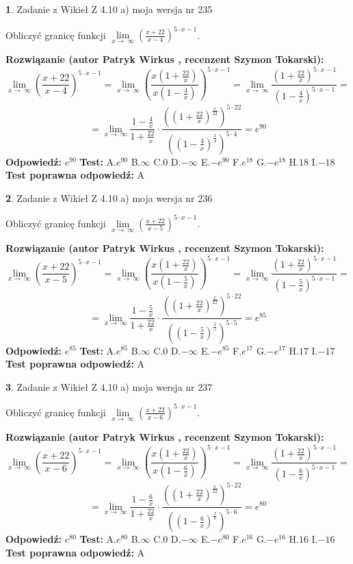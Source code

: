 \documentclass[12pt, a4paper]{article}
\theoremstyle{definition} %
\newtheorem{zad}{}
\newcommand{\zadStart}[1]{\begin{zad}#1\newline}
\newcommand{\zadStop}{\end{zad}}
\newcommand{\rozwStart}[2]{\noindent \textbf{Rozwiązanie (autor #1 , recenzent #2): }\newline}
\newcommand{\rozwStop}{\newline}
\newcommand{\odpStart}{\noindent \textbf{Odpowiedź:}\newline}
\newcommand{\odpStop}{\newline}
\newcommand{\testStart}{\noindent \textbf{Test:}\newline}
\newcommand{\testStop}{\newline}
\newcommand{\kluczStart}{\noindent \textbf{Test poprawna odpowiedź:}\newline}
\newcommand{\kluczStop}{\newline}
\begin{document}
\zadStart{Zadanie z Wikieł Z 4.10 a) moja wersja nr 235}

Obliczyć granicę funkcji  $\lim\limits_{x\to\ \infty}(\frac{x+22}{x-4})^{5\cdot x-1}$.
\zadStop
\rozwStart{Patryk Wirkus}{Szymon Tokarski}
$$\lim\limits_{x\to\ \infty}(\frac{x+22}{x-4})^{5\cdot x-1} = \lim\limits_{x\to\ \infty}(\frac{x(1+\frac{22}{x})}{x(1-\frac{4}{x})})^{5\cdot x-1}=\lim\limits_{x\to\ \infty}\frac{(1+\frac{22}{x})^{5\cdot x-1}}{(1-\frac{4}{x})^{5\cdot x-1}}=$$
$$=\lim\limits_{x\to\ \infty}\frac{1-\frac{4}{x}}{1+\frac{22}{x}}\cdot\frac{((1+\frac{22}{x})^{\frac{x}{22}})^{5\cdot22}}{((1-\frac{4}{x})^{\frac{x}{4}})^{5\cdot4}}=e^{90}$$
\rozwStop
\odpStart
$e^{90}$
\odpStop
\testStart
A.$e^{90}$ B.$\infty$ C.$0$ D.$-\infty$ E.$-e^{90}$
F.$e^{18}$ G.$-e^{18}$
H.$18$
I.$-18$
\testStop
\kluczStart
A
\kluczStop



\zadStart{Zadanie z Wikieł Z 4.10 a) moja wersja nr 236}

Obliczyć granicę funkcji  $\lim\limits_{x\to\ \infty}(\frac{x+22}{x-5})^{5\cdot x-1}$.
\zadStop
\rozwStart{Patryk Wirkus}{Szymon Tokarski}
$$\lim\limits_{x\to\ \infty}(\frac{x+22}{x-5})^{5\cdot x-1} = \lim\limits_{x\to\ \infty}(\frac{x(1+\frac{22}{x})}{x(1-\frac{5}{x})})^{5\cdot x-1}=\lim\limits_{x\to\ \infty}\frac{(1+\frac{22}{x})^{5\cdot x-1}}{(1-\frac{5}{x})^{5\cdot x-1}}=$$
$$=\lim\limits_{x\to\ \infty}\frac{1-\frac{5}{x}}{1+\frac{22}{x}}\cdot\frac{((1+\frac{22}{x})^{\frac{x}{22}})^{5\cdot22}}{((1-\frac{5}{x})^{\frac{x}{5}})^{5\cdot5}}=e^{85}$$
\rozwStop
\odpStart
$e^{85}$
\odpStop
\testStart
A.$e^{85}$ B.$\infty$ C.$0$ D.$-\infty$ E.$-e^{85}$
F.$e^{17}$ G.$-e^{17}$
H.$17$
I.$-17$
\testStop
\kluczStart
A
\kluczStop



\zadStart{Zadanie z Wikieł Z 4.10 a) moja wersja nr 237}

Obliczyć granicę funkcji  $\lim\limits_{x\to\ \infty}(\frac{x+22}{x-6})^{5\cdot x-1}$.
\zadStop
\rozwStart{Patryk Wirkus}{Szymon Tokarski}
$$\lim\limits_{x\to\ \infty}(\frac{x+22}{x-6})^{5\cdot x-1} = \lim\limits_{x\to\ \infty}(\frac{x(1+\frac{22}{x})}{x(1-\frac{6}{x})})^{5\cdot x-1}=\lim\limits_{x\to\ \infty}\frac{(1+\frac{22}{x})^{5\cdot x-1}}{(1-\frac{6}{x})^{5\cdot x-1}}=$$
$$=\lim\limits_{x\to\ \infty}\frac{1-\frac{6}{x}}{1+\frac{22}{x}}\cdot\frac{((1+\frac{22}{x})^{\frac{x}{22}})^{5\cdot22}}{((1-\frac{6}{x})^{\frac{x}{6}})^{5\cdot6}}=e^{80}$$
\rozwStop
\odpStart
$e^{80}$
\odpStop
\testStart
A.$e^{80}$ B.$\infty$ C.$0$ D.$-\infty$ E.$-e^{80}$
F.$e^{16}$ G.$-e^{16}$
H.$16$
I.$-16$
\testStop
\kluczStart
A
\kluczStop
\end{document}
